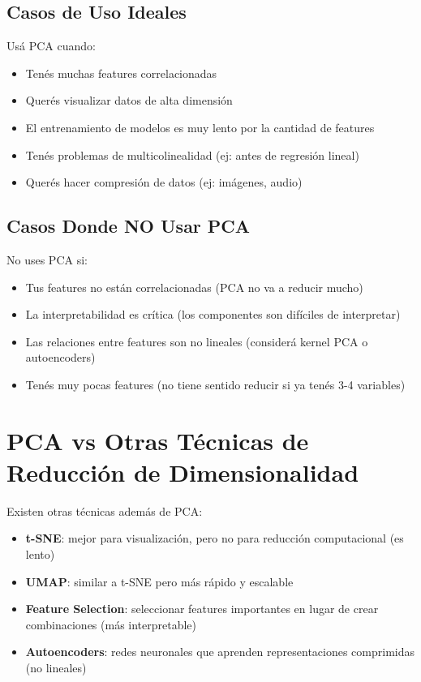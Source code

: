 \documentclass[12pt]{article}
\begin{document}
\subsection{Casos de Uso Ideales}

Usá PCA cuando:

\begin{itemize}
    \item Tenés muchas features correlacionadas
    \item Querés visualizar datos de alta dimensión
    \item El entrenamiento de modelos es muy lento por la cantidad de features
    \item Tenés problemas de multicolinealidad (ej: antes de regresión lineal)
    \item Querés hacer compresión de datos (ej: imágenes, audio)
\end{itemize}

\subsection{Casos Donde NO Usar PCA}

No uses PCA si:

\begin{itemize}
    \item Tus features no están correlacionadas (PCA no va a reducir mucho)
    \item La interpretabilidad es crítica (los componentes son difíciles de interpretar)
    \item Las relaciones entre features son no lineales (considerá kernel PCA o autoencoders)
    \item Tenés muy pocas features (no tiene sentido reducir si ya tenés 3-4 variables)
\end{itemize}

\section{PCA vs Otras Técnicas de Reducción de Dimensionalidad}

Existen otras técnicas además de PCA:

\begin{itemize}
    \item \textbf{t-SNE}: mejor para visualización, pero no para reducción computacional (es lento)
    \item \textbf{UMAP}: similar a t-SNE pero más rápido y escalable
    \item \textbf{Feature Selection}: seleccionar features importantes en lugar de crear combinaciones (más interpretable)
    \item \textbf{Autoencoders}: redes neuronales que aprenden representaciones comprimidas (no lineales)
\end{itemize}
\end{document}
